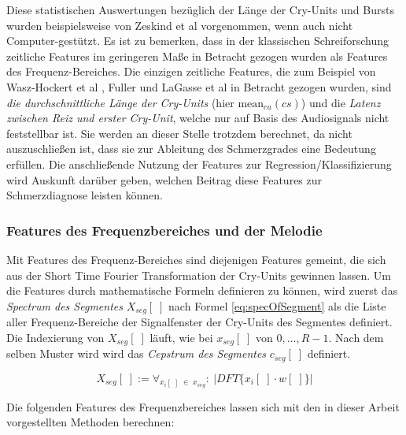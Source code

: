 Diese statistischen Auswertungen bezüglich der Länge der Cry-Units und Bursts wurden beispielsweise von Zeskind et al \cite{rythmic} vorgenommen, wenn auch nicht Computer-gestützt. Es ist zu bemerken, dass in der klassischen Schreiforschung zeitliche Features im geringeren Maße in Betracht gezogen wurden als Features des Frequenz-Bereiches. Die einzigen zeitliche Features, die zum Beispiel von Wasz-Hockert et al \cite{25years}, Fuller \cite{threeCryTypes} und LaGasse et al\cite{parentalPerception} in Betracht gezogen wurden, sind \emph{die durchschnittliche Länge der Cry-Units} (hier $\text{mean}_{cu}(cs)$) und die \emph{Latenz zwischen Reiz und erster Cry-Unit}, welche nur auf Basis des Audiosignals nicht feststellbar ist. Sie werden an dieser Stelle trotzdem berechnet, da nicht auszuschließen ist, dass sie zur Ableitung des Schmerzgrades eine Bedeutung erfüllen. Die anschließende Nutzung der Features zur Regression/Klassifizierung wird Auskunft darüber geben, welchen Beitrag diese Features zur Schmerzdiagnose leisten können.

\subsubsection*{Features des Frequenzbereiches und der Melodie}

Mit Features des Frequenz-Bereiches sind diejenigen Features gemeint, die sich aus der Short Time Fourier Transformation der Cry-Units gewinnen lassen. Um die Features durch mathematische Formeln definieren zu können, wird zuerst das \emph{Spectrum des Segmentes} $X_{seg}[\;]$ nach Formel \ref{eq:specOfSegment} als die Liste aller Frequenz-Bereiche der Signalfenster der Cry-Units des Segmentes definiert. Die Indexierung von $X_{seg}[\;]$ läuft, wie bei $x_{seg}[\;]$ von $0 , \ldots , R-1$. Nach dem selben Muster wird wird das \emph{Cepstrum des Segmentes} $c_{seg}[\;]$ definiert.

\begin{equation}
X_{seg}[\; ] := \mathop{\forall}_{x_i[\;] \; \in \; x_{seg}} :\ |DFT\{x_i[\;] \cdot w[\;]\}|
\label{eq:specOfSegment}
\end{equation}

Die folgenden Features des Frequenzbereiches lassen sich mit den in dieser Arbeit vorgestellten Methoden berechnen:

